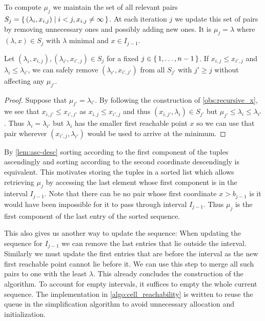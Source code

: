 To compute \(\mu_j\) we maintain the set of all relevant pairs \(S_j = \set{(\lambda_i, x_{i, j}) \mid i < j, x_{i, j} \neq \infty}\). At each iteration \(j\) we update this set of pairs by removing unnecessary ones and possibly adding new ones. It is \(\mu_j = \lambda\) where \((\lambda, x) \in S_j\) with \(\lambda\) minimal and \(x \in I_{j-1}\).

\begin{lemma}\label{lem:asc-desc}
	Let \((\lambda_i, x_{i, j}), (\lambda_{i'}, x_{i', j}) \in S_j\) for a fixed \(j \in \set{1, \dots, n-1}\). If \(x_{i, j} \leq x_{i', j}\) and \(\lambda_i \leq \lambda_{i'}\), we can safely remove \((\lambda_{i'}, x_{i', j'})\) from all \(S_{j'}\) with \(j' \geq j\) without affecting any \(\mu_{j'}\).
\end{lemma}
\begin{proof}
	Suppose that \(\mu_{j'} = \lambda_{i'}\). By following the construction of \cref{obs:recursive_x}, we see that \(x_{i, j'} \leq x_{i', j'}\) as \(x_{i, j} \leq x_{i', j}\) and thus \((x_{i, j'}, \lambda_i) \in S_{j'}\) but \(\mu_{j'} \leq \lambda_i \leq \lambda_{i'}\). Thus \(\lambda_i = \lambda_{i'}\) but \(\lambda_i\) has the smaller first reachable point \(x\) so we can use that pair wherever \((x_{i', j}, \lambda_{i'})\) would be used to arrive at the minimum.
\end{proof}

By \cref{lem:asc-desc} sorting according to the first component of the tuples ascendingly and sorting according to the second coordinate descendingly is equivalent. This motivates storing the tuples in a sorted list which allows retrieving \(\mu_j\) by accessing the last element whose first component is in the interval \(I_{j-1}\). Note that there can be no pair whose first coordinate \(x > b_{j-1}\) is it would have been impossible for it to pass through interval \(I_{j-1}\). Thus \(\mu_j\) is the first component of the last entry of the sorted sequence. 

This also gives us another way to update the sequence: When updating the sequence for \(I_{j-1}\) we can remove the last entries that lie outside the interval. Similarly we must update the first entries that are before the interval as the new first reachable point cannot lie before it. We can use this step to merge all such pairs to one with the least \(\lambda\). This already concludes the construction of the algorithm. To account for empty intervals, it suffices to empty the whole current sequence. The implementation in \cref{algo:cell_reachability} is written to reuse the queue in the simplification algorithm to avoid unnecessary allocation and initialization.


